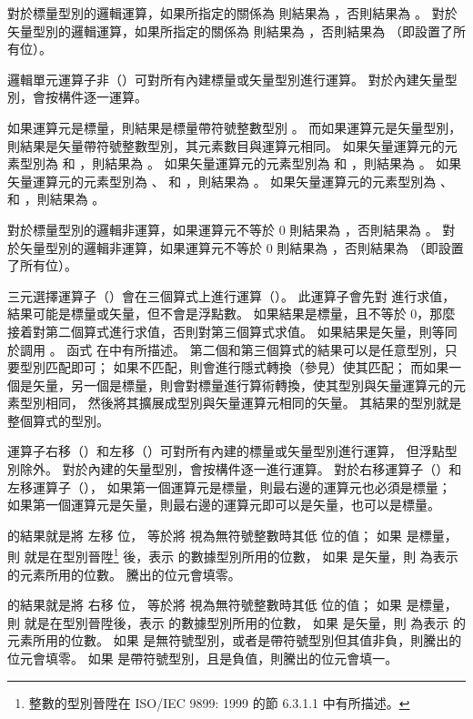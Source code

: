 對於標量型別的邏輯運算，如果所指定的關係為  則結果為 ，否則結果為 。
對於矢量型別的邏輯運算，如果所指定的關係為  則結果為 ，否則結果為  （即設置了所有位）。
\stopitem

\startitem
邏輯單元運算子非（\ccmm{!}）可對所有內建標量或矢量型別進行運算。
對於內建矢量型別，會按構件逐一運算。

如果運算元是標量，則結果是標量帶符號整數型別 。
而如果運算元是矢量型別，則結果是矢量帶符號整數型別，其元素數目與運算元相同。
如果矢量運算元的元素型別為  和 ，則結果為 。
如果矢量運算元的元素型別為  和 ，則結果為 。
如果矢量運算元的元素型別為 、  和 ，則結果為 。
如果矢量運算元的元素型別為 、  和 ，則結果為 。

對於標量型別的邏輯非運算，如果運算元不等於 0 則結果為 ，否則結果為 。
對於矢量型別的邏輯非運算，如果運算元不等於 0 則結果為 ，否則結果為  （即設置了所有位）。
\stopitem

\startitem
三元選擇運算子（）會在三個算式上進行運算（）。
此運算子會先對  進行求值，結果可能是標量或矢量，但不會是浮點數。
如果結果是標量，且不等於 0，那麼接着對第二個算式進行求值，否則對第三個算式求值。
如果結果是矢量，則等同於調用 。
函式  在中有所描述。
第二個和第三個算式的結果可以是任意型別，只要型別匹配即可；
如果不匹配，則會進行隱式轉換（參見）使其匹配；
而如果一個是矢量，另一個是標量，則會對標量進行算術轉換，使其型別與矢量運算元的元素型別相同，
然後將其擴展成型別與矢量運算元相同的矢量。
其結果的型別就是整個算式的型別。
\stopitem

\startitem
運算子右移（\ccmm{>>}）和左移（\ccmm{<<}）可對所有內建的標量或矢量型別進行運算，
但浮點型別除外。
對於內建的矢量型別，會按構件逐一進行運算。
對於右移運算子（\ccmm{>>}）和左移運算子（\ccmm{<<}），
如果第一個運算元是標量，則最右邊的運算元也必須是標量；
如果第一個運算元是矢量，則最右邊的運算元即可以是矢量，也可以是標量。

 的結果就是將  左移  位，
  等於將  視為無符號整數時其低  位的值；
如果  是標量，則  就是在型別晉陞\footnote{
整數的型別晉陞在 ISO/IEC 9899: 1999 的節 6.3.1.1 中有所描述。}
後，表示  的數據型別所用的位數，
如果  是矢量，則  為表示  的元素所用的位數。
騰出的位元會填零。

 的結果就是將  右移  位，
  等於將  視為無符號整數時其低  位的值；
如果  是標量，則  就是在型別晉陞後，表示  的數據型別所用的位數，
如果  是矢量，則  為表示  的元素所用的位數。
如果  是無符號型別，或者是帶符號型別但其值非負，則騰出的位元會填零。
如果  是帶符號型別，且是負值，則騰出的位元會填一。
\stopitem


\stopigBig
